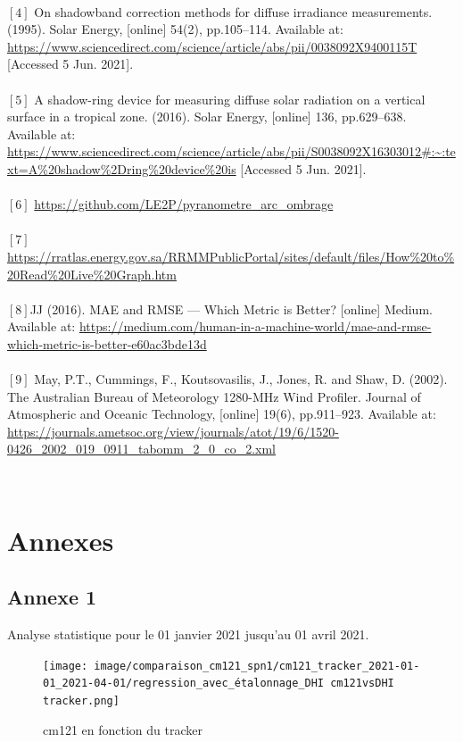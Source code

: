 \documentclass[12pt,a4paper]{article}
\begin{document}
\begin{flushleft}
‌~\\
$[4]$ On shadowband correction methods for diffuse irradiance measurements. (1995). Solar Energy, [online] 54(2), pp.105–114. Available at: \url{https://www.sciencedirect.com/science/article/abs/pii/0038092X9400115T} [Accessed 5 Jun. 2021].\\

‌~\\
$[5]$ A shadow-ring device for measuring diffuse solar radiation on a vertical surface in a tropical zone. (2016). Solar Energy, [online] 136, pp.629–638. Available at: \url{https://www.sciencedirect.com/science/article/abs/pii/S0038092X16303012#:~:text=A\%20shadow\%2Dring\%20device\%20is} [Accessed 5 Jun. 2021].\\
‌~\\
$[6]$ \url{https://github.com/LE2P/pyranometre\_arc\_ombrage} \\
~\\
$[7]$ \url{https://rratlas.energy.gov.sa/RRMMPublicPortal/sites/default/files/How\%20to\%20Read\%20Live\%20Graph.htm} \\
~\\
$[8]$JJ (2016). MAE and RMSE — Which Metric is Better? [online] Medium. Available at: \href{https://medium.com/human-in-a-machine-world/mae-and-rmse-which-metric-is-better-e60ac3bde13d}{https://medium.com/human-in-a-machine-world/mae-and-rmse-which-metric-is-better-e60ac3bde13d}\\
~\\
$[9]$ May, P.T., Cummings, F., Koutsovasilis, J., Jones, R. and Shaw, D. (2002). The Australian Bureau of Meteorology 1280-MHz Wind Profiler. Journal of Atmospheric and Oceanic Technology, [online] 19(6), pp.911–923. Available at: \url{https://journals.ametsoc.org/view/journals/atot/19/6/1520-0426_2002_019_0911_tabomm_2_0_co_2.xml}

\newpage

‌\section{Annexes}
\subsection*{Annexe 1}
Analyse statistique pour le 01 janvier 2021 jusqu'au 01 avril 2021.

\begin{figure}[H]
\centering
\texttt{[image: image/comparaison\_cm121\_spn1/cm121\_tracker\_2021-01-01\_2021-04-01/regression\_avec\_étalonnage\_DHI cm121vsDHI tracker.png]} 
\caption{cm121 en fonction du tracker}    
\end{figure}


\end{flushleft}
\end{document}

